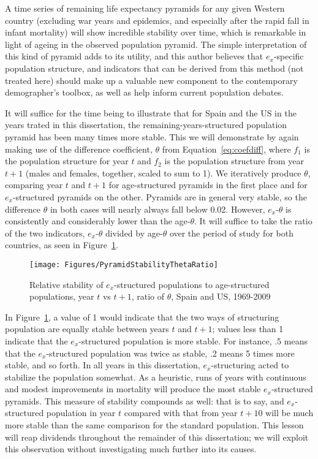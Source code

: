 A time series of remaining life expectancy pyramids for any given Western 
country (excluding war years and epidemics, and especially after the rapid fall
in infant mortality) will show incredible stability over time, which is
remarkable in light of ageing in the observed population pyramid. The simple 
interpretation of this kind of pyramid adds to its utility, and this author 
believes that $e_x$-specific population structure, and
indicators that can be derived from this method (not treated here) should 
make up a valuable new component to the contemporary demographer's toolbox, as well 
as help inform current population debates. 

It will suffice for the time being to
illustrate that for Spain and the US in the years trated in this dissertation,
the remaining-years-structured population pyramid has been many times more
stable. This we will demonstrate by again making use of the difference
coefficient, $\theta$ from Equation~\ref{eq:coefdiff}, where $f_1$ is the
population structure for year $t$ and $f_2$ is the population structure from
year $t+1$ (males and females, together, scaled to sum to 1). We iteratively
produce $\theta$, comparing year $t$ and $t+1$ for age-structured pyramids in
the first place and for $e_x$-structured pyramids on the other. Pyramids are in
general very stable, so the difference $\theta$ in both cases will nearly always
fall below 0.02. However, $e_x$-$\theta$ is consistently and considerably lower
than the age-$\theta$. It will suffice to take the ratio of the two indicators,
 $e_x$-$\theta$ divided by age-$\theta$ over the period of study for both
 countries, as seen in Figure~\ref{fig:PyramidStability}.

\begin{figure}
      \centering
      \caption{Relative stability of $e_x$-structured populations to
                age-structured populations, year $t$ vs $t+1$, ratio of
                $\theta$, Spain and US, 1969-2009} 
         \texttt{[image: Figures/PyramidStabilityThetaRatio]}
      \label{fig:PyramidStability} 
\end{figure}

In Figure~\ref{fig:PyramidStability}, a value of 1 would indicate that the two
ways of structuring population are equally stable between years $t$ and $t+1$;
values less than 1 indicate that the $e_x$-structured population is more stable.
For instance, .5 means that the $e_x$-structured population was twice as stable,
.2 means 5 times more stable, and so forth. In all years in this dissertation,
$e_x$-structuring acted to stabilize the population somewhat. As a heuristic,
runs of years with continuous and modest improvements in mortality will produce
the most stable $e_x$-structured pyramids. This measure of stability compounds
as well: that is to say, and $e_x$-structured population in year $t$
compared with that from year $t+10$ will be much more stable than the same
comparison for the standard population. This lesson will reap dividends
throughout the remainder of this dissertation; we will exploit this observation
without investigating much further into its causes.

